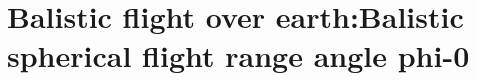 \section{ Balistic flight over earth:Balistic spherical flight range  angle phi-0 }\label{sec:q3}    
